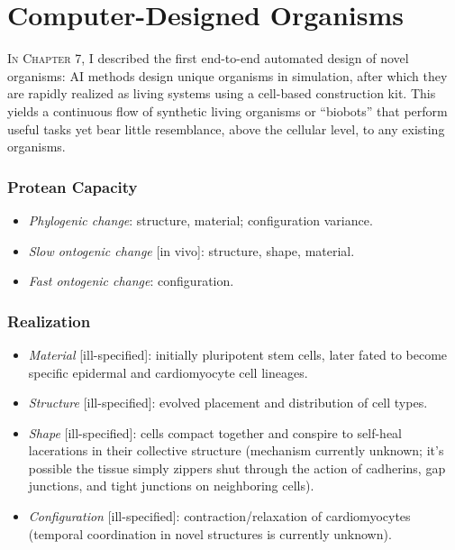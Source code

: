 \section{Computer-Designed Organisms}


\textsc{In Chapter 7,}
I described the first end-to-end automated design of novel organisms: AI methods design unique organisms in simulation, after which they are rapidly realized as living systems using a cell-based construction kit. 
This yields a continuous flow of synthetic living organisms or ``biobots'' that perform useful tasks yet bear little resemblance, above the cellular level, to any existing organisms. 



\subsubsection*{Protean Capacity}

\begin{itemize}
    \item \textit{Phylogenic change}: structure, material; configuration variance.
    \item \textit{Slow ontogenic change} [in vivo]: structure, shape, material.
    \item \textit{Fast ontogenic change}: configuration.
\end{itemize}


\subsubsection*{Realization}

\begin{itemize}
    \item \textit{Material} [ill-specified]: initially pluripotent stem cells, later fated to become specific epidermal and cardiomyocyte cell lineages.
    \item \textit{Structure} [ill-specified]: evolved placement and distribution of cell types.
    \item \textit{Shape} [ill-specified]: cells compact together and conspire to self-heal lacerations in their collective structure (mechanism currently unknown; it's possible the tissue simply zippers shut through the action of cadherins, gap junctions, and tight junctions on neighboring cells).
    
    \item \textit{Configuration} [ill-specified]: contraction/relaxation of cardiomyocytes (temporal coordination in novel structures is currently unknown).
\end{itemize}


